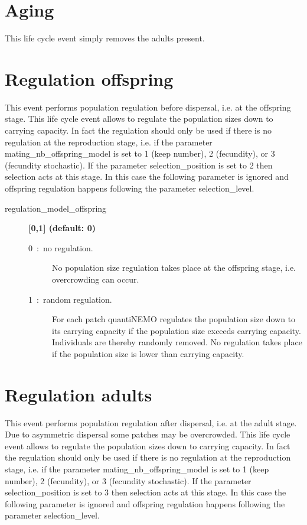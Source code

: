 \documentclass[letterpaper,12pt,oneside]{book}
\begin{document}
\section{Aging}\label{4aging}
This life cycle event simply removes the adults present.


\section{Regulation offspring}\label{5regulation}
This event performs population regulation before dispersal, i.e. at the offspring stage. This life cycle event allows to regulate the population sizes down to carrying capacity. In fact the regulation should only be used if there is no regulation at the reproduction stage, i.e. if the parameter \textsf{mating\_nb\_offspring\_model} is set to 1 (keep number), 2 (fecundity), or 3 (fecundity stochastic). If the parameter \textsf{selection\_position} is set to 2 then selection acts at this stage. In this case the following parameter is ignored and offspring regulation happens following the parameter \textsf{selection\_level}.  
\begin{description}
\item[regulation\_model\_offspring] \textbf{[0,1] (default: 0)}
\begin{description}
\item[0~:~no regulation.] No population size regulation takes place at the offspring stage, i.e. overcrowding can occur.
\item[1~:~random regulation.] For each patch quantiNEMO regulates the population size down to its carrying capacity if the population size exceeds carrying capacity. Individuals are thereby randomly removed. No regulation takes place if the population size is lower than carrying capacity.
\end{description}
\end{description}



\section{Regulation adults}\label{7regulation}
This event performs population regulation after dispersal, i.e. at the adult stage. Due to asymmetric dispersal some patches may be overcrowded. This life cycle event allows to regulate the population sizes down to carrying capacity. In fact the regulation should only be used if there is no regulation at the reproduction stage, i.e. if the parameter \textsf{mating\_nb\_offspring\_model} is set to 1 (keep number), 2 (fecundity), or 3 (fecundity stochastic). If the parameter \textsf{selection\_position} is set to 3 then selection acts at this stage. In this case the following parameter is ignored and offspring regulation happens following the parameter \textsf{selection\_level}.  
\end{document}
